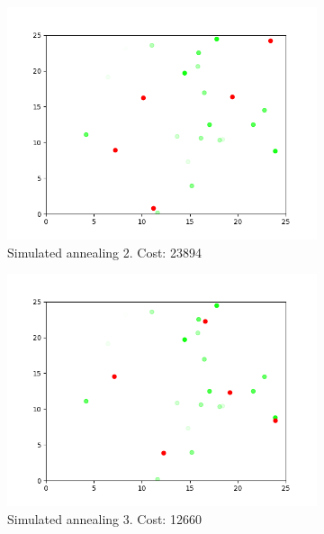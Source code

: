 \documentclass[11pt]{article}
\begin{document}
\begin{figure}[h!]
\begin{subfigure}[b]{0.4\linewidth}
    \includegraphics[width=\linewidth]{simulated_annealing_2.png}
    \caption*{Simulated annealing 2. Cost: 23894}
  \end{subfigure}
  \begin{subfigure}[b]{0.4\linewidth}
    \includegraphics[width=\linewidth]{simulated_annealing_3.png}
    \caption*{Simulated annealing 3. Cost: 12660}
  \end{subfigure}
  \begin{subfigure}[b]{0.4\linewidth}

\end{subfigure}
\end{figure}
\end{document}

